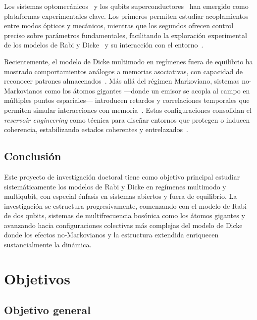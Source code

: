 \documentclass[onecolumn,notitlepage,letterpaper,aps,pra,12pt]{article}
\numberwithin{equation}{section}
\begin{document}
Los sistemas optomecánicos~\cite{debnath2015} y los qubits superconductores~\cite{Lamata2017} han emergido como plataformas experimentales clave. Los primeros permiten estudiar acoplamientos entre modos ópticos y mecánicos, mientras que los segundos ofrecen control preciso sobre parámetros fundamentales, facilitando la exploración experimental de los modelos de Rabi y Dicke~\cite{Mezzacapo14} y su interacción con el entorno~\cite{hwang2018,Lo2021}.

Recientemente, el modelo de Dicke multimodo en regímenes fuera de equilibrio ha mostrado comportamientos análogos a memorias asociativas, con capacidad de reconocer patrones almacenados~\cite{fiorelli2020}. Más allá del régimen Markoviano, sistemas no-Markovianos como los átomos gigantes —donde un emisor se acopla al campo en múltiples puntos espaciales— introducen retardos y correlaciones temporales que permiten simular interacciones con memoria~\cite{kockum2019,guo2020}. Estas configuraciones consolidan el \textit{reservoir engineering} como técnica para diseñar entornos que protegen o inducen coherencia, estabilizando estados coherentes y entrelazados~\cite{poyatos1996,Diehl2008}.


\subsection{Conclusión}

Este proyecto de investigación doctoral tiene como objetivo principal estudiar sistemáticamente los modelos de Rabi y Dicke en regímenes multimodo y multiqubit, con especial énfasis en sistemas abiertos y fuera de equilibrio. La investigación se estructura progresivamente, comenzando con el modelo de Rabi de dos qubits, sistemas de multifrecuencia bosónica como los átomos gigantes y  avanzando hacia configuraciones colectivas más complejas del modelo de Dicke  donde los efectos no-Markovianos y la estructura  extendida enriquecen sustancialmente la dinámica.



\section{Objetivos}

\subsection{Objetivo general}
\end{document}
